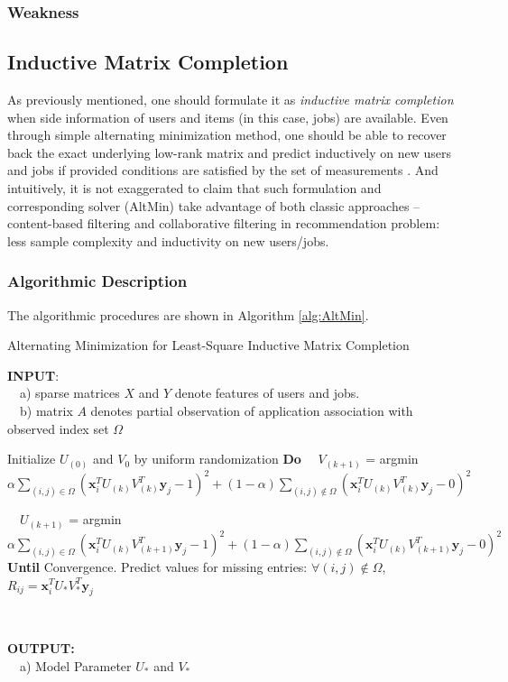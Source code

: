 \documentclass{article} %
\begin{document}
\subsubsection{Weakness}

\subsection{Inductive Matrix Completion} %

As previously mentioned, one should formulate it as {\it inductive matrix
    completion} when side information of users and items (in this case, jobs)
are available. 
Even through simple alternating minimization method, one should be able to
recover back the exact underlying low-rank matrix and predict inductively on
new users and jobs if provided conditions are satisfied by the set of
measurements \cite{jain2013provable}. 
And intuitively, it is not exaggerated to claim that such formulation and
corresponding solver (AltMin) take advantage of both classic approaches -- content-based
filtering and collaborative filtering in recommendation problem: 
    less sample complexity and inductivity on new users/jobs. 

\subsubsection{Algorithmic Description} 
\newcommand{\xii}{\boldsymbol{x}_i}
\newcommand{\yj}{\boldsymbol{y}_j}
The algorithmic procedures are shown in Algorithm \ref{alg:AltMin}.
\begin{algorithm}
    \caption{Alternating Minimization for Least-Square Inductive Matrix
        Completion}
    \label{alg:AltMin}
    \begin{algorithmic}[1]

\State \textbf{INPUT}: \\ \ \ a) sparse matrices $X$ and $Y$ denote features of users
and jobs. \\ \ \ b) matrix $A$ denotes partial observation of application
association with observed index set $\Omega$
\State \

\State Initialize $U_{(0)}$ and $V_{0}$ by uniform randomization
\State \textbf{Do}  
\State \  \
    $V_{(k+1)}$ = argmin $\alpha \sum_{(i,j) \in \Omega} 
    (\xii^T U_{(k)} V_{(k)}^T \yj - 1)^2 
    + (1-\alpha) \sum_{(i,j) \not \in \Omega} (\xii^T U_{(k)} V_{(k)}^T \yj - 0)^2$

\State \  \
$U_{(k+1)}$ = argmin $\alpha \sum_{(i,j) \in \Omega}(\xii^T
    U_{(k)} V_{(k+1)}^T \yj - 1)^2 +
    (1-\alpha) \sum_{(i,j) \not \in \Omega}(\xii^T U_{(k)} V_{(k+1)}^T \yj - 0)^2$
\State \textbf{Until} Convergence. 
\State Predict values for missing entries: $\forall (i,j) \not \in \Omega$, 
$R_{ij} = \xii^T U_{*} V_{*}^T \yj$

\State \

\State \textbf{OUTPUT: } \\ 
\ \ a) Model Parameter $ U_{*}$ and $V_{*}$ 
\end{algorithmic}
\end{algorithm}
\end{document}
